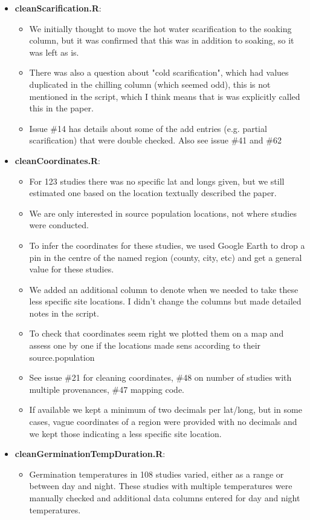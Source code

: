 \documentclass{article}[12pt]
\begin{document}
\begin{enumerate}
\begin{itemize}
\item \textbf{cleanScarification.R}: 
\begin{itemize}
\item We initially thought to move the hot water scarification to the soaking column, but it was confirmed that this was in addition to soaking, so it was left as is. 
\item There was also a question about "cold scarification", which had values duplicated in the chilling column (which seemed odd), this is not mentioned in the script, which I think means that is was explicitly called this in the paper. 
\item Issue \#14 has details about some of the add entries (e.g. partial scarification) that were double checked.  Also see issue \#41 and \#62
\end{itemize}
\item \textbf{cleanCoordinates.R}: 
\begin{itemize}
\item For 123 studies there was no specific lat and longs given, but we still estimated one based on the location textually described the paper. 
\item We are only interested in source population locations, not where studies were conducted. 
\item To infer the coordinates for these studies, we used Google Earth to drop a pin in the centre of the named region (county, city, etc) and get a general value for these studies. 
\item We added an additional column to denote when we needed to take these less specific site locations. I didn't change the columns but made detailed notes in the script. 
\item To check that coordinates seem right we plotted them on a map and assess one by one if the locations made sens according to their source.population
\item See issue \#21 for cleaning coordinates, \#48 on number of studies with multiple provenances, \#47 mapping code.
\item If available we kept a minimum of two decimals per lat/long, but in some cases, vague coordinates of a region were provided with no decimals and we kept those indicating a less specific site location. 
\end{itemize}
\item \textbf{cleanGerminationTempDuration.R}: 
\begin{itemize} 
\item Germination temperatures in 108 studies varied, either as a range or between day and night. These studies with multiple temperatures were manually checked and additional data columns entered for day and night temperatures. 

\end{itemize}
\end{itemize}
\end{enumerate}
\end{document}

